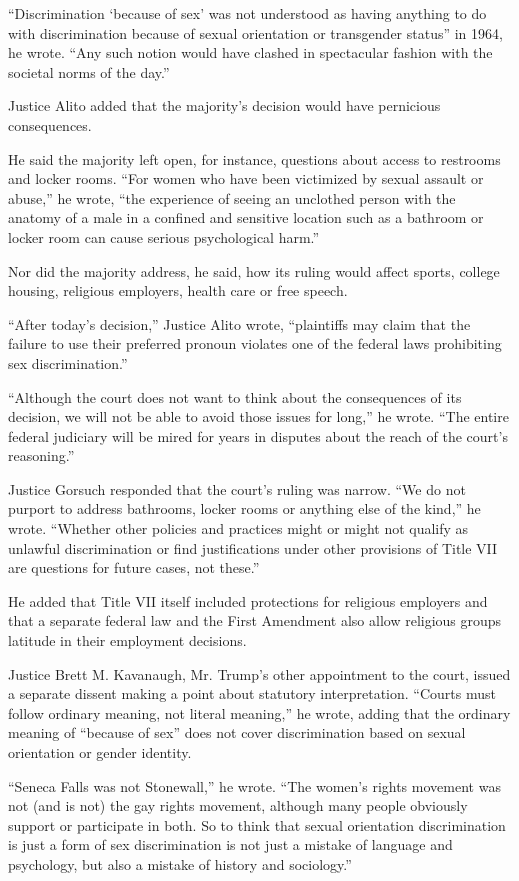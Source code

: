``Discrimination `because of sex' was not understood as having anything
to do with discrimination because of sexual orientation or transgender
status'' in 1964, he wrote. ``Any such notion would have clashed in
spectacular fashion with the societal norms of the day.''

Justice Alito added that the majority's decision would have pernicious
consequences.

He said the majority left open, for instance, questions about access to
restrooms and locker rooms. ``For women who have been victimized by
sexual assault or abuse,'' he wrote, ``the experience of seeing an
unclothed person with the anatomy of a male in a confined and sensitive
location such as a bathroom or locker room can cause serious
psychological harm.''

Nor did the majority address, he said, how its ruling would affect
sports, college housing, religious employers, health care or free
speech.

``After today's decision,'' Justice Alito wrote, ``plaintiffs may claim
that the failure to use their preferred pronoun violates one of the
federal laws prohibiting sex discrimination.''

``Although the court does not want to think about the consequences of
its decision, we will not be able to avoid those issues for long,'' he
wrote. ``The entire federal judiciary will be mired for years in
disputes about the reach of the court's reasoning.''

Justice Gorsuch responded that the court's ruling was narrow. ``We do
not purport to address bathrooms, locker rooms or anything else of the
kind,'' he wrote. ``Whether other policies and practices might or might
not qualify as unlawful discrimination or find justifications under
other provisions of Title VII are questions for future cases, not
these.''

He added that Title VII itself included protections for religious
employers and that a separate federal law and the First Amendment also
allow religious groups latitude in their employment decisions.

Justice Brett M. Kavanaugh, Mr. Trump's other appointment to the court,
issued a separate dissent making a point about statutory interpretation.
``Courts must follow ordinary meaning, not literal meaning,'' he wrote,
adding that the ordinary meaning of ``because of sex'' does not cover
discrimination based on sexual orientation or gender identity.

``Seneca Falls was not Stonewall,'' he wrote. ``The women's rights
movement was not (and is not) the gay rights movement, although many
people obviously support or participate in both. So to think that sexual
orientation discrimination is just a form of sex discrimination is not
just a mistake of language and psychology, but also a mistake of history
and sociology.''

